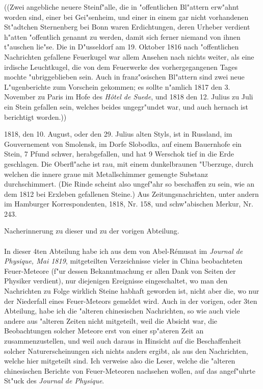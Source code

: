 \documentclass[a4paper, 11pt, oneside, polutonikogreek, german]{article}
\begin{document}
((Zwei angebliche neuere Steinf"alle, die in "offentlichen Bl"attern erw"ahnt worden sind, einer bei Gei"senheim, und einer in einem gar nicht vorhandenen St"adtchen Sternenberg bei Bonn waren Erdichtungen, deren Urheber verdient h"atten "offentlich genannt zu werden, damit sich ferner niemand von ihnen t"auschen lie"se. Die in D"usseldorf am 19. Oktober 1816 nach "offentlichen Nachrichten gefallene Feuerkugel war allem Ansehen nach nichts weiter, als eine irdische Leuchtkugel, die von dem Feuerwerke des vorhergegangenen Tages mochte "ubriggeblieben sein. Auch in franz"osischen Bl"attern sind zwei neue L"ugenberichte zum Vorschein gekommen; es sollte n"amlich 1817 den 3. November zu Paris im Hofe des \emph{Hôtel de Suede}, und 1818 den 12. Julius zu Juli ein Stein gefallen sein, welches beides ungegr"undet war, und auch hernach ist berichtigt worden.))

1818, den 10. August, oder den 29. Julius alten Styls, ist in Russland, im Gouvernement von Smolensk, im Dorfe Slobodka, auf einem Bauernhofe ein Stein, 7 Pfund schwer, herabgefallen, und hat 9 Werschok tief in die Erde geschlagen. Die Oberfl"ache ist rau, mit einem dunkelbraunen "Uberzuge, durch welchen die innere graue mit Metallschimmer gemengte Substanz durchschimmert. (Die Rinde scheint also ungef"ahr so beschaffen zu sein, wie an dem 1812 bei Erxleben gefallenen Steine.) Aus Zeitungsnachrichten, unter andern im Hamburger Korrespondenten, 1818, Nr. 158, und schw"abischen Merkur, Nr. 243.
\begin{center}
Nacherinnerung zu dieser und zu der vorigen Abteilung.
\end{center}
\paragraph{}
In dieser 4ten Abteilung habe ich aus dem von Abel-Rémusat im \emph{Journal de Physique, Mai 1819}, mitgeteilten Verzeichnisse vieler in China beobachteten Feuer-Meteore (f"ur dessen Bekanntmachung er allen Dank von Seiten der Physiker verdient), nur diejenigen Ereignisse eingeschaltet, wo man den Nachrichten zu Folge wirklich Steine habhaft geworden ist, nicht aber die, wo nur der Niederfall eines Feuer-Meteors gemeldet wird. Auch in der vorigen, oder 3ten Abteilung, habe ich die "alteren chinesischen Nachrichten, so wie auch viele andere aus "alteren Zeiten nicht mitgeteilt, weil die Absicht war, die Beobachtungen solcher Meteore erst von einer sp"ateren Zeit an zusammenzustellen, und weil auch daraus in Hinsicht auf die Beschaffenheit solcher Naturerscheinungen sich nichts anders ergibt, als aus den Nachrichten, welche hier mitgeteilt sind. Ich verweise also die Leser, welche die "alteren chinesischen Berichte von Feuer-Meteoren nachsehen wollen, auf das angef"uhrte St"uck des \emph{Journal de Physique}.
\clearpage
\end{document}
